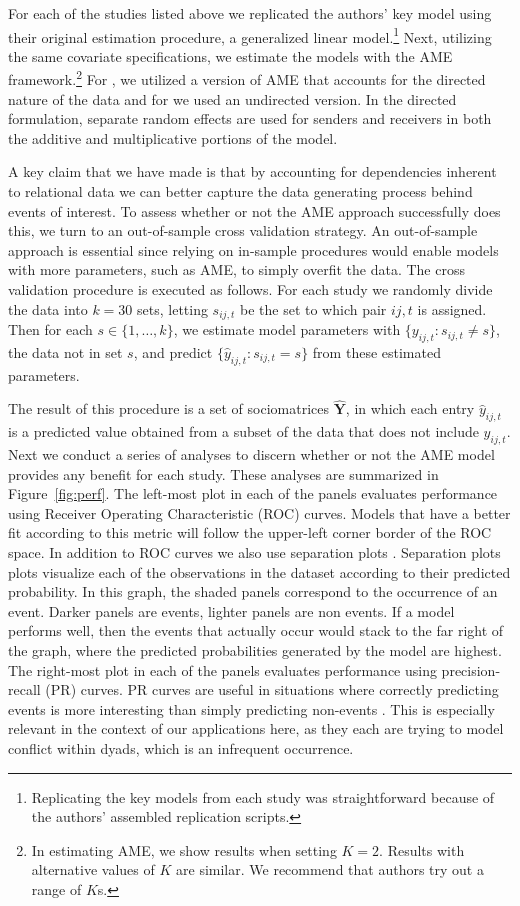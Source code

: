 For each of the studies listed above we replicated the authors' key model using their original estimation procedure, a generalized linear model.\footnote{Replicating the key models from each study was straightforward because of the authors' assembled replication scripts.} Next, utilizing the same covariate specifications, we estimate the models with the AME framework.\footnote{In estimating AME, we show results when setting $K=2$. Results with alternative values of $K$ are similar. We recommend that authors try out a range of $K$s.} For \citet{reiter:stam:2003, weeks:2012}, we utilized a version of AME that accounts for the directed nature of the data and for \citet{gibler:2017} we used an undirected version. In the directed formulation, separate random effects are used for senders and receivers in both the additive and multiplicative portions of the model.

A key claim that we have made is that by accounting for dependencies inherent to relational data we can better capture the data generating process behind events of interest. To assess whether or not the AME approach successfully does this, we turn to an out-of-sample cross validation strategy. An out-of-sample approach is essential since relying on in-sample procedures would enable models with more parameters, such as AME, to simply overfit the data. The cross validation procedure is executed as follows. For each study  we randomly divide the data into $k=30$ sets, letting $s_{ij,t}$ be the set to which pair $ij,t$ is assigned. Then for each $s \in \{1,\ldots,k\}$, we estimate model parameters with $\{y_{ij,t}: s_{ij,t} \neq s\}$, the data not in set $s$, and predict $\{\hat{y}_{ij,t}: s_{ij,t} = s\}$ from these estimated parameters.

The result of this procedure is a set of sociomatrices $\bm \hat Y$, in which each entry $\hat y_{ij,t}$ is a predicted value obtained from a subset of the data that does not include $y_{ij,t}$. Next we conduct a series of analyses to discern whether or not the AME model provides any benefit for each study. These analyses are summarized in Figure~\ref{fig:perf}. The left-most plot in each of the panels evaluates performance using Receiver Operating Characteristic (ROC) curves. Models that have a better fit according to this metric will follow the upper-left corner border of the ROC space. In addition to ROC curves we also use separation plots \citep{greenhill:etal:2011}.  Separation plots plots visualize each of the observations in the dataset according to their predicted probability. In this graph, the shaded panels correspond to the occurrence of an event. Darker panels are events, lighter panels are non events. If a model performs well, then the events that actually occur would stack to the far right of the graph, where the predicted probabilities generated by the model are highest. The right-most plot in each of the panels evaluates performance using precision-recall (PR) curves. PR curves are useful in situations where correctly predicting events is more interesting than simply predicting non-events \citep{davis:goadrich:2006}. This is especially relevant in the context of our applications here, as they each are trying to model conflict within dyads, which is an infrequent occurrence.

